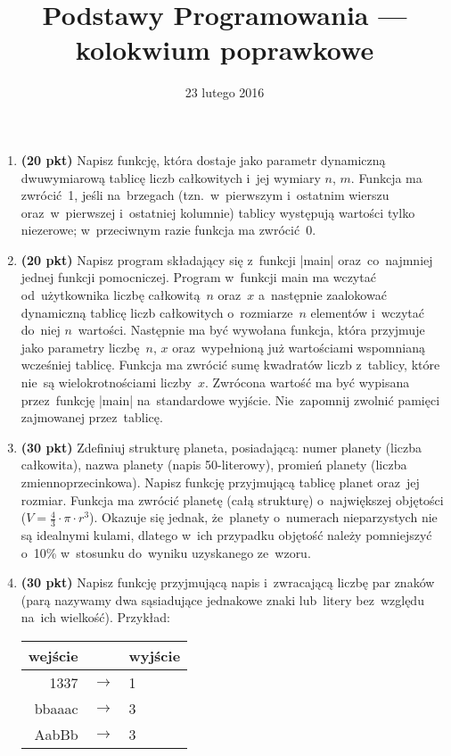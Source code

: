 \documentclass[extrafontsizes,12pt]{article}
\title{Podstawy Programowania --- kolokwium poprawkowe}
\date{23 lutego 2016}
\begin{document}
\maketitle
\DefineShortVerb{\|}
\thispagestyle{empty}

\begin{enumerate}
\itemsep4pt

\item \textbf{(20 pkt)}
Napisz funkcję, która dostaje jako parametr dynamiczną
dwuwymiarową tablicę liczb całkowitych i~jej wymiary $n$, $m$.
Funkcja ma zwrócić~1, jeśli na~brzegach
(tzn.~w~pierwszym i~ostatnim wierszu oraz~w~pierwszej
i~ostatniej kolumnie) tablicy występują wartości tylko niezerowe;
w~przeciwnym razie funkcja ma zwrócić~0. 

\item \textbf{(20 pkt)}
Napisz program składający się z~funkcji |main|
oraz~co~najmniej jednej funkcji pomocniczej.
Program w~funkcji main ma wczytać od~użytkownika liczbę całkowitą~$n$ oraz~$x$
a~następnie zaalokować dynamiczną tablicę liczb całkowitych
o~rozmiarze~$n$ elementów i~wczytać do~niej $n$~wartości.
Następnie ma być wywołana funkcja,
która przyjmuje jako parametry liczbę~$n$, $x$
oraz~wypełnioną już wartościami wspomnianą wcześniej tablicę.
Funkcja ma zwrócić sumę kwadratów liczb z~tablicy,
które nie~są wielokrotnościami liczby~$x$.
Zwrócona wartość ma być wypisana przez~funkcję |main| na~standardowe wyjście.
Nie~zapomnij zwolnić pamięci zajmowanej przez~tablicę.

\item \textbf{(30 pkt)}
Zdefiniuj strukturę planeta, posiadającą:
numer planety (liczba całkowita),
nazwa planety (napis 50-literowy),
promień planety (liczba zmiennoprzecinkowa).
Napisz funkcję przyjmującą tablicę planet
oraz~jej rozmiar.
Funkcja ma zwrócić planetę (całą strukturę)
o~największej objętości ($V = \frac{4}{3} \cdot \pi \cdot r^3$).
Okazuje się jednak, że~planety o~numerach nieparzystych
nie są idealnymi kulami, dlatego w~ich przypadku
objętość należy pomniejszyć o~10\%
w~stosunku do~wyniku uzyskanego ze~wzoru.

\item \textbf{(30 pkt)}
Napisz funkcję przyjmującą napis i~zwracającą liczbę par znaków
(parą nazywamy dwa sąsiadujące jednakowe znaki lub~litery
bez~względu na~ich wielkość).
Przykład:
\begin{center}
\begin{tabular}{ r c l }
wejście & & wyjście \\
\hline
1337 & $\rightarrow$ & 1 \\
bbaaac & $\rightarrow$ & 3 \\
AabBb & $\rightarrow$ & 3 \\
\end{tabular}
\end{center}

\end{enumerate}
\end{document}
